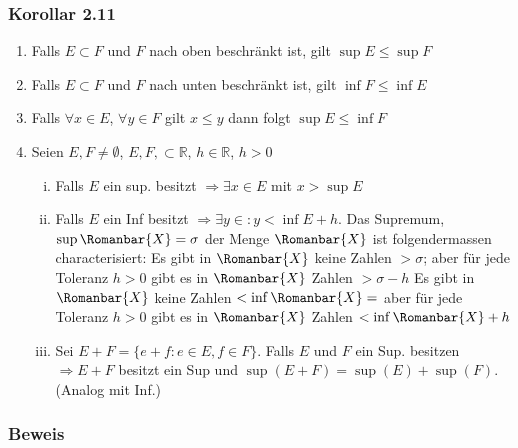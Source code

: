 \subsubsection*{Korollar 2.11}
\begin{enumerate}
\item Falls $E\subset F$ und $F$ nach oben beschränkt ist, gilt $\sup E\leq \sup F$ 
\item Falls $E\subset F$ und $F$ nach unten beschränkt ist, gilt $\inf F\leq \inf E$ 
\item Falls $\forall x\in E$, $\forall y\in F$ gilt $x\leq y$ dann folgt $\sup E\leq\inf F$ 
\item Seien $E,F\not=\emptyset$, $E,F,\subset\mathbb{R}$, $h\in\mathbb{R}$, $h>0$ 
\begin{enumerate}[(i)]
\item Falls $E$ ein sup. besitzt $\Rightarrow \exists x\in E$ mit $x>\sup E$
\item Falls $E$ ein Inf besitzt $\Rightarrow \exists y\in : y<\inf E+h$. Das Supremum, $\sup\Romanbar{X}=\sigma$ der Menge $\Romanbar{X}$ ist folgendermassen characterisiert: Es gibt in $\Romanbar{X}$ keine Zahlen $>\sigma$; aber für jede Toleranz $h>0$ gibt es in $\Romanbar{X}$ Zahlen $>\sigma -h$ Es gibt in $\Romanbar{X}$ keine Zahlen $<\inf\Romanbar{X}=$ aber für jede Toleranz $h>0$ gibt es in $\Romanbar{X}$ Zahlen $<\inf \Romanbar{X}+h$
\item Sei $E+F=\{ e+f:e\in E,f\in F\}$. Falls $E$ und $F$ ein Sup. besitzen $\Rightarrow E+F$ besitzt ein Sup und $\sup (E+F)=\sup(E)+\sup(F)$. (Analog mit Inf.) 
\end{enumerate}
\end{enumerate}
\subsubsection*{Beweis}
